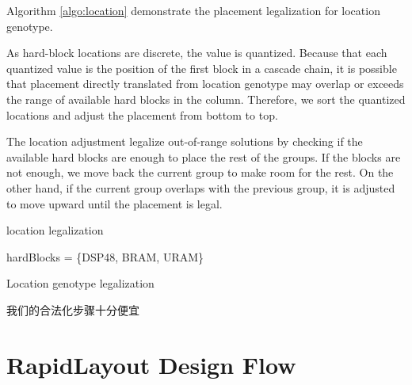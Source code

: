 Algorithm \ref{algo:location} demonstrate the placement legalization for location genotype. 

As hard-block locations are discrete, the value is quantized. Because that each quantized value is the position of the first block in a cascade chain, it is possible that placement directly translated from location genotype may overlap or exceeds the range of available hard blocks in the column. Therefore, we sort the quantized locations and adjust the placement from bottom to top. 

The location adjustment legalize out-of-range solutions by checking if the available hard blocks are enough to place the rest of the groups. If the blocks are not enough, we move back the current group to make room for the rest. On the other hand, if the current group overlaps with the previous group, it is adjusted to move upward until the placement is legal.

location legalization
\begin{algorithm}
	
	
	hardBlocks = \{DSP48, BRAM, URAM\}\;
	
	\caption{Location genotype legalization}	
	\label{algo:location}
\end{algorithm}






我们的合法化步骤十分便宜



\section{RapidLayout Design Flow}






